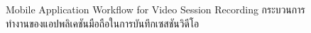 \begin{figure}[ht]
    \begin{center}
    
    \end{center}
    \newcommand{\VideoSessionRecordTransition}{\ifenglish Mobile Application Workflow for Video Session Recording \else กระบวนการทำงานของแอปพลิเคชันมือถือในการบันทึกเซสชันวิดีโอ \fi}
    \caption[\VideoSessionRecordTransition]{\VideoSessionRecordTransition}
    \label{fig:video session recording work flow}
\end{figure}